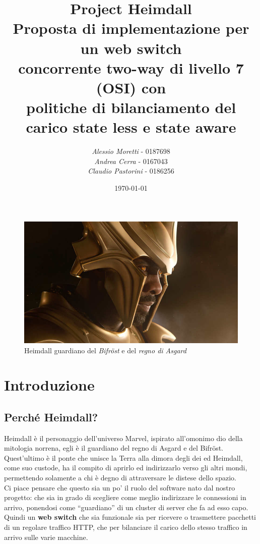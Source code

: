 \documentclass[italian]{tktltiki2}
\title{%
    \huge Project Heimdall 
    \\
    \large Proposta di implementazione per un web switch 
    \\
    concorrente two-way di livello 7 (OSI) con
    \\
    politiche di bilanciamento del carico state less e state aware
  }
\author{\emph{Alessio Moretti} - 0187698
    \\
    \emph{Andrea Cerra} - 0167043
    \\
    \emph{Claudio Pastorini} - 0186256}
\date{\today}
\begin{document}
\maketitle        %

\tableofcontents  %

\begin{figure}[H]
\centering
\includegraphics[width=\textwidth]{images/heimdall}
\caption{Heimdall guardiano del \emph{Bifröst} e del \emph{regno di Asgard}}
\end{figure}

\mainmatter       %

\newpage
\section{Introduzione}
\subsection{Perché Heimdall?}
Heimdall è il personaggio dell'universo Marvel, ispirato all'omonimo dio della mitologia norrena, egli è il guardiano del regno di Asgard e del Bifröst. Quest'ultimo è il ponte che unisce la Terra alla dimora degli dei ed Heimdall, come suo custode, ha il compito di aprirlo ed indirizzarlo verso gli altri mondi, permettendo solamente a chi è degno di attraversare le distese dello spazio.
\\
Ci piace pensare che questo sia un po' il ruolo del software nato dal nostro progetto: che sia in grado di scegliere come meglio indirizzare le connessioni in arrivo, ponendosi come ``guardiano'' di un cluster di server che fa ad esso capo. Quindi un \textbf{web switch} che sia funzionale sia per ricevere o trasmettere pacchetti di un regolare traffico HTTP, che per bilanciare il carico dello stesso traffico in arrivo sulle varie macchine.
\end{document}

